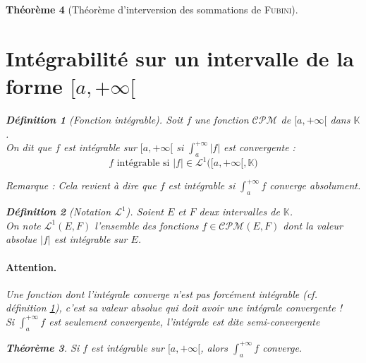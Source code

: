 \documentclass[11pt,a4paper]{report}
\newtheorem{theorem}{Théorème}[chapter]
\theoremstyle{definition}
\newtheorem{dfn}[theorem]{Définition}
\begin{document}
\begin{theorem}[Théorème d'interversion des sommations de \textsc{Fubini}]
\section{Intégrabilité sur un intervalle de la forme $[a,+\infty [$} %
\label{sec:integrabilite}
\begin{dfn}[Fonction intégrable]
    \label{dfn:integrable}
     Soit $f$ une fonction $\mathcal{CPM}$ de $[a,+\infty[$ dans $\mathbb{K}$.\\
     On dit que $f$ est \emph{intégrable} sur $[a,+\infty[$ si $\int_a^{+\infty} |f|$ est convergente : 
     \begin{equation}
     f\text{ intégrable si } |f|\in\mathcal{L}^1\bigg([a,+\infty[,\mathbb{K}\bigg)
     \end{equation}
\end{dfn}
\emph{Remarque : }Cela revient à dire que $f$ est intégrable si $\int_a^{+\infty} f$ converge absolument. 
\begin{dfn}[Notation $\mathcal{L}^1$]
     Soient $E$ et $F$ deux intervalles de $\mathbb{K}$.\\
     On note $\mathcal{L}^1(E,F)$ l'ensemble des fonctions $f \in \mathcal{CPM}(E,F)$ dont la valeur absolue $|f|$ est intégrable sur $E$.
\end{dfn}
\paragraph{Attention.} Une fonction dont l'intégrale converge n'est pas forcément intégrable (\textit{cf.} définition \ref{dfn:integrable}), c'est sa valeur absolue qui doit avoir une intégrale convergente !\\
Si $\int_a^{+\infty} f$ est seulement convergente, l'intégrale est dite \emph{semi-convergente}
\begin{theorem}
     Si $f$ est intégrable sur $[a,+\infty[$, alors $\int_a^{+\infty} f$ converge.
\end{theorem}


\end{theorem}
\end{document}

